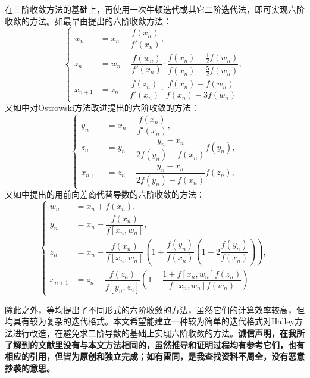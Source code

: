 在三阶收敛方法的基础上，再使用一次牛顿迭代或其它二阶迭代法，即可实现六阶收敛的方法。如最早由\cite{neta1979sixth}提出的六阶收敛方法：
\begin{equation}
    \label{eq:NM}
    \begin{cases}
        w_n &= x_n - \dfrac{f(x_n)}{f'(x_n)}, \\
        z_n &= w_n - \dfrac{f(w_n)}{f'(x_n)} \cdot \dfrac{f(x_n) - \frac{1}{2} f(w_n)}{f(x_n) - \frac{5}{2} f(w_n)}, \\
        x_{n+1} &= z_n - \dfrac{f(z_n)}{f'(x_n)} \cdot \dfrac{f(x_n)-f(w_n)}{f(x_n) - 3f(w_n)}
    \end{cases}
\end{equation}
又如\cite{grau2006improvement}中对Ostrowski方法\cite{householder1967solution}改进提出的六阶收敛的方法：
\begin{equation}
    \label{eq:GM}
    \begin{cases}
        y_n &= x_n - \dfrac{f(x_n)}{f'(x_n)}, \\
        z_n &= y_n - \dfrac{y_n - x_n}{2f(y_n) - f(x_n)}f(y_n), \\
        x_{n+1} &= z_n - \dfrac{y_n - x_n}{2f(y_n) - f(x_n)}f(z_n),
    \end{cases}
\end{equation}
又如\cite{soleymani2011new}中提出的用前向差商代替导数的六阶收敛的方法：
\begin{equation}
    \begin{cases}
        w_n &= x_n + f(x_n), \\
        y_n &= x_n - \dfrac{f(x_n)}{f[x_n, w_n]}, \\
        z_n &= x_n - \dfrac{f(x_n)}{f[x_n, w_n]}\left( 1 + \dfrac{f(y_n)}{f(x_n)} \left( 1 + 2\dfrac{f(y_n)}{f(x_n)} \right) \right), \\
        x_{n+1} &= z_n - \dfrac{f(z_n)}{f[y_n, z_n]}\left( 1 - \dfrac{1+f[x_n,w_n]f(z_n)}{f[x_n, w_n]f(w_n)} \right)
    \end{cases}
\end{equation}

除此之外，\cite{chun2012new}\cite{solaiman2019two}\cite{narang2016new}等均提出了不同形式的六阶收敛的方法，虽然它们的计算效率较高，但均具有较为复杂的迭代格式。本文希望能建立一种较为简单的迭代格式对Halley方法进行改造，在避免求二阶导数的基础上实现六阶收敛的方法。\textbf{诚信声明，在我所了解到的文献里没有与本文方法相同的，虽然推导和证明过程均有参考它们，也有相应的引用，但皆为原创和独立完成；如有雷同，是我查找资料不周全，没有恶意抄袭的意思。}

